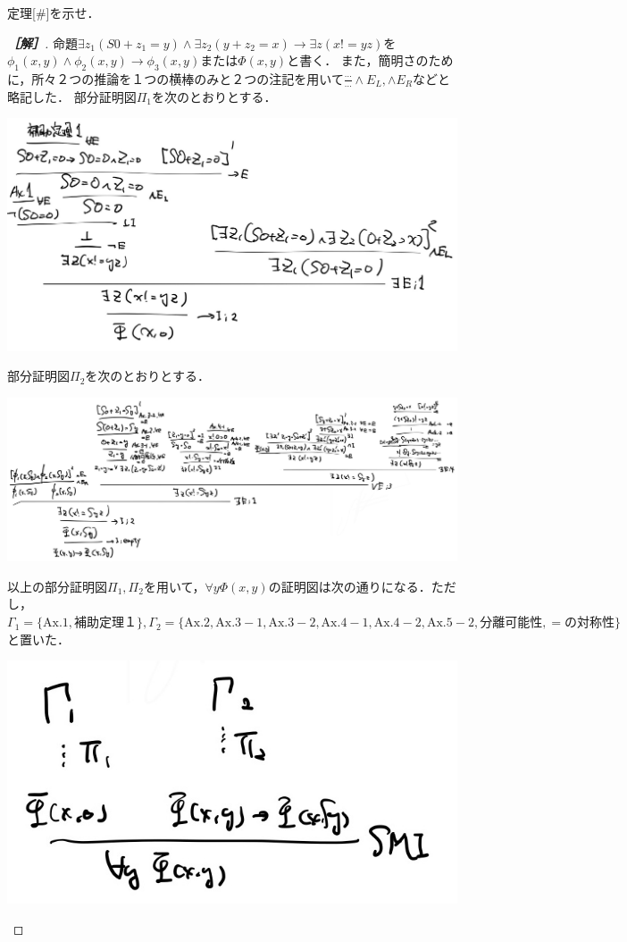 \documentclass[uplatex,dvipdfmx]{jsarticle}
\begin{document}
\begin{problem}
    定理[\#]を示せ．
\end{problem}
\begin{proof}[\bf{［解］}]
    命題$\exists z_1(S0+z_1=y)\land\exists z_2(y+z_2=x)\to\exists z(x!=yz)$を$\phi_1(x,y)\land\phi_2(x,y)\to\phi_3(x,y)$または$\Phi(x,y)$と書く．
    また，簡明さのために，所々２つの推論を１つの横棒のみと２つの注記を用いて$\frac{\cdots}{\cdots}\land E_L,\land E_R$などと略記した．
    部分証明図$\Pi_1$を次のとおりとする．
    \begin{center}
        \includegraphics[width=15cm]{figure3-4.jpg}
    \end{center}
    部分証明図$\Pi_2$を次のとおりとする．
    \begin{center}
        \includegraphics[width=15cm]{figure3-5.jpg}
    \end{center}
    以上の部分証明図$\Pi_1,\Pi_2$を用いて，$\forall y\Phi(x,y)$の証明図は次の通りになる．ただし，$\Gamma_1=\{\mathrm{Ax.1}, 補助定理１ \},\Gamma_2=\{\mathrm{Ax.2,Ax.3-1,Ax.3-2,Ax.4-1,Ax.4-2,Ax.5-2},分離可能性,=の対称性\}$と置いた．
    \begin{center}
        \includegraphics[width=15cm]{figure3-6.jpg}

\end{center}
\end{proof}
\end{document}
